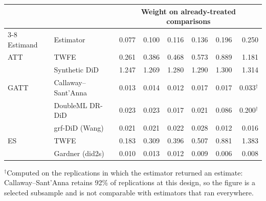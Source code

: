 \begin{tabular}{llrrrrrr}
\toprule
& & \multicolumn{6}{c}{Weight on already-treated comparisons} \\
\cmidrule(lr){3-8}
Estimand & Estimator & 0.077 & 0.100 & 0.116 & 0.136 & 0.196 & 0.250 \\
\midrule
ATT & TWFE & 0.261 & 0.386 & 0.468 & 0.573 & 0.889 & 1.181 \\
 & Synthetic DiD & 1.247 & 1.269 & 1.280 & 1.290 & 1.300 & 1.314 \\
\midrule
GATT & Callaway--Sant'Anna & 0.013 & 0.014 & 0.012 & 0.017 & 0.017 & 0.033$^{\dagger}$ \\
 & DoubleML DR-DiD & 0.023 & 0.023 & 0.017 & 0.021 & 0.086 & 0.200$^{\dagger}$ \\
 & grf-DiD (Wang) & 0.021 & 0.021 & 0.022 & 0.028 & 0.012 & 0.016 \\
\midrule
ES & TWFE & 0.183 & 0.309 & 0.396 & 0.507 & 0.881 & 1.383 \\
 & Gardner (did2s) & 0.010 & 0.013 & 0.012 & 0.009 & 0.006 & 0.008 \\
\bottomrule
\end{tabular}
\par\smallskip\footnotesize $^{\dagger}$Computed on the replications in which the estimator returned an estimate: Callaway--Sant'Anna retains 92\% of replications at this design, so the figure is a selected subsample and is not comparable with estimators that ran everywhere.
